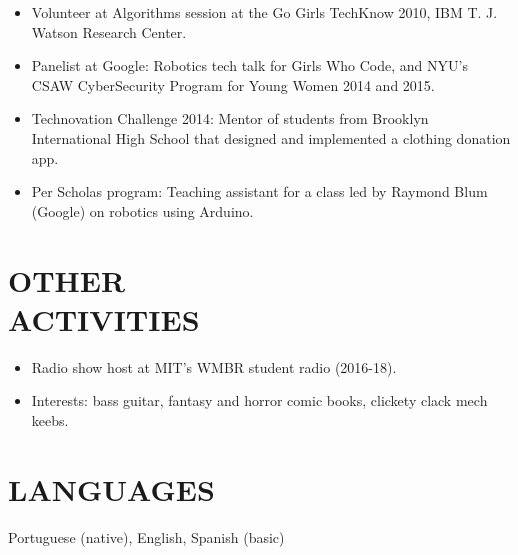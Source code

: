 \documentclass[line,margin]{res}
\begin{document}
\begin{resume}
\begin{itemize}
	      \item Volunteer at Algorithms session at the Go Girls TechKnow 2010, IBM T. J. Watson Research Center.
	      \item Panelist at Google: Robotics tech talk for Girls Who Code, and NYU's 
	      CSAW CyberSecurity Program for Young Women 2014 and 2015.
	      \item Technovation Challenge 2014: Mentor of students from Brooklyn International High School that designed and implemented a clothing donation app.
	      \item Per Scholas program: Teaching assistant for a class led by Raymond Blum (Google) on robotics using Arduino.
               \end{itemize}

\section{OTHER \\ ACTIVITIES}            \begin{itemize}  \itemsep -2pt
  \item Radio show host at MIT's WMBR student radio (2016-18).
            \item Interests: bass guitar, fantasy and horror comic books, clickety clack mech keebs.
            \end{itemize}

\section{LANGUAGES}
Portuguese (native), English, Spanish (basic)

\end{resume}
\end{document}
